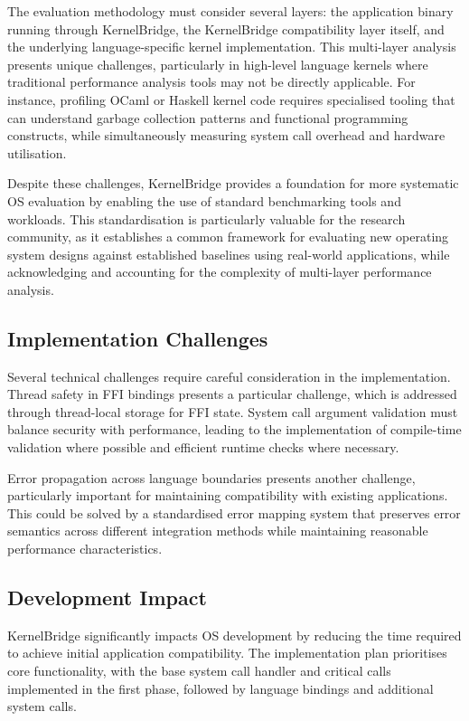 \documentclass[conference]{IEEEtran}
\begin{document}
The evaluation methodology must consider several layers: the application binary running through KernelBridge, the KernelBridge compatibility layer itself, and the underlying language-specific kernel implementation. This multi-layer analysis presents unique challenges, particularly in high-level language kernels where traditional performance analysis tools may not be directly applicable. For instance, profiling OCaml or Haskell kernel code requires specialised tooling that can understand garbage collection patterns and functional programming constructs, while simultaneously measuring system call overhead and hardware utilisation.

Despite these challenges, KernelBridge provides a foundation for more systematic OS evaluation by enabling the use of standard benchmarking tools and workloads. This standardisation is particularly valuable for the research community, as it establishes a common framework for evaluating new operating system designs against established baselines using real-world applications, while acknowledging and accounting for the complexity of multi-layer performance analysis.

\subsection{Implementation Challenges}
Several technical challenges require careful consideration in the implementation. Thread safety in
FFI bindings presents a particular challenge, which is addressed through thread-local storage for FFI
state. System call argument validation must balance security with performance, leading to the implementation of compile-time validation where possible and efficient runtime checks where necessary.

Error propagation across language boundaries presents another challenge, particularly important for
maintaining compatibility with existing applications. This could be solved by a standardised error mapping system that preserves error semantics across different integration methods while maintaining reasonable performance characteristics.

\subsection{Development Impact}
KernelBridge significantly impacts OS development by reducing the time required to achieve initial
application compatibility. The implementation plan prioritises core functionality, with the base system call handler and critical calls implemented in the first phase, followed by language bindings and additional system calls.
\end{document}

